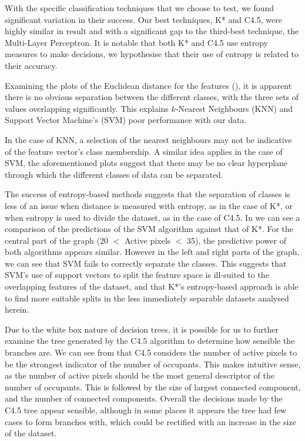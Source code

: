 \documentclass[../thesis/thesis.tex]{subfiles}
\begin{document}
With the specific classification techniques that we choose to test, we found significant variation in their success. Our best techniques, K* and C4.5, were highly similar in result and with a significant gap to the third-best technique, the Multi-Layer Perceptron. It is notable that both K* and C4.5 use entropy measures to make decisions, we hypothesise that their use of entropy is related to their accuracy.

Examining the plots of the Euclidean distance for the features (), it is apparent there is no obvious separation between the different classes, with the three sets of values overlapping significantly. This explains $k$-Nearest Neighbours (KNN) and Support Vector Machine's (SVM) poor performance with our data.

In the case of KNN, a selection of the nearest neighbours may not be indicative of the feature vector's class membership. A similar idea applies in the case of SVM, the aforementioned plots suggest that there may be no clear hyperplane through which the different classes of data can be separated.

The success of entropy-based methods suggests that the separation of classes is less of an issue when distance is measured with entropy, as in the case of K*, or when entropy is used to divide the dataset, as in the case of C4.5. In  we can see a comparison of the predictions of the SVM algorithm against that of K*. For the central part of the graph (20 $<$ Active pixels $<$ 35), the predictive power of both algorithms appears similar. However in the left and right parts of the graph, we can see that SVM fails to correctly separate the classes. This suggests that SVM's use of support vectors to split the feature space is ill-suited to the overlapping features of the dataset, and that K*'s entropy-based approach is able to find more suitable splits in the less immediately separable datasets analysed herein.

Due to the white box nature of decision trees, it is possible for us to further examine the tree generated by the C4.5 algorithm  to determine how sensible the branches are. We can see from  that C4.5 considers the number of active pixels to be the strongest indicator of the number of occupants. This makes intuitive sense, as the number of active pixels should be the most general descriptor of the number of occupants. This is followed by the size of largest connected component, and the number of connected components. Overall the decisions made by the C4.5 tree appear sensible, although in some places it appears the tree had few cases to form branches with, which could be rectified with an increase in the size of the dataset.
\end{document}
